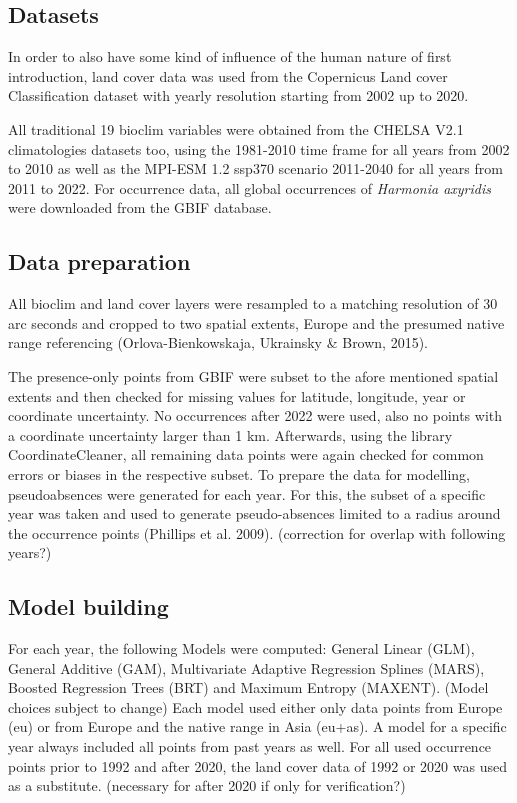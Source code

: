 \documentclass[12pt]{article}
\begin{document}
\subsection{Datasets}
In order to also have some kind of influence of the human nature of first introduction, land cover data was used from the Copernicus Land cover Classification dataset with yearly resolution starting from 2002 up to 2020.

All traditional 19 bioclim variables were obtained from the CHELSA V2.1 climatologies datasets too, using the 1981-2010 time frame for all years from 2002 to 2010 as well as the MPI-ESM 1.2 ssp370 scenario 2011-2040 for all years from 2011 to 2022. 
For occurrence data, all global occurrences of \textit{Harmonia axyridis} were downloaded from the GBIF database.

\subsection{Data preparation}
All bioclim and land cover layers were resampled to a matching resolution of 30 arc seconds and cropped to two spatial extents, Europe and the presumed native range referencing (Orlova-Bienkowskaja, Ukrainsky \& Brown, 2015).

The presence-only points from GBIF were subset to the afore mentioned spatial extents and then checked for missing values for latitude, longitude, year or coordinate uncertainty. 
No occurrences after 2022 were used, also no points with a coordinate uncertainty larger than 1 km. 
Afterwards, using the library CoordinateCleaner, all remaining data points were again checked for common errors or biases in the respective subset.
To prepare the data for modelling, pseudoabsences were generated for each year. 
For this, the subset of a specific year was taken and used to generate pseudo-absences limited to a radius around the occurrence points (Phillips et al. 2009). (correction for overlap with following years?)

\subsection{Model building}
For each year, the following Models were computed: General Linear (GLM), General Additive (GAM), Multivariate Adaptive Regression Splines (MARS), Boosted Regression Trees (BRT) and Maximum Entropy (MAXENT). 
(Model choices subject to change)
Each model used either only data points from Europe (eu) or from Europe and the native range in Asia (eu+as). 
A model for a specific year always included all points from past years as well.
For all used occurrence points prior to 1992 and after 2020, the land cover data of 1992 or 2020 was used as a substitute.
(necessary for after 2020 if only for verification?)
\end{document}
